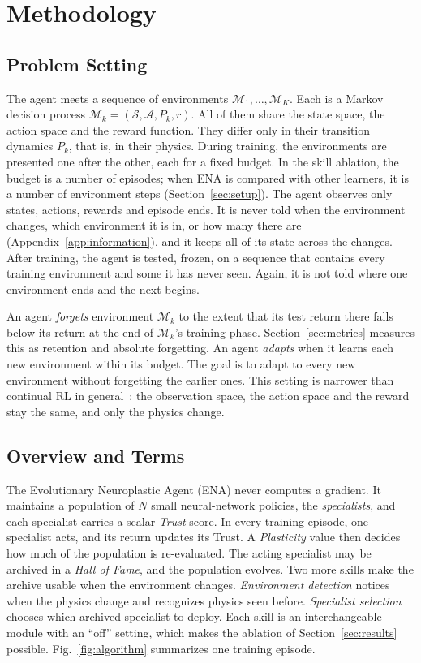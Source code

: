 \section{Methodology}
\label{sec:method}

\subsection{Problem Setting}
\label{sec:problem}
The agent meets a sequence of environments $\mathcal{M}_1, \dots, \mathcal{M}_K$. Each is a Markov decision process $\mathcal{M}_k = (\mathcal{S}, \mathcal{A}, P_k, r)$. All of them share the state space, the action space and the reward function. They differ only in their transition dynamics $P_k$, that is, in their physics. During training, the environments are presented one after the other, each for a fixed budget. In the skill ablation, the budget is a number of episodes; when ENA is compared with other learners, it is a number of environment steps (Section~\ref{sec:setup}). The agent observes only states, actions, rewards and episode ends. It is never told when the environment changes, which environment it is in, or how many there are (Appendix~\ref{app:information}), and it keeps all of its state across the changes. After training, the agent is tested, frozen, on a sequence that contains every training environment and some it has never seen. Again, it is not told where one environment ends and the next begins.

An agent \textit{forgets} environment $\mathcal{M}_k$ to the extent that its test return there falls below its return at the end of $\mathcal{M}_k$'s training phase. Section~\ref{sec:metrics} measures this as retention and absolute forgetting. An agent \textit{adapts} when it learns each new environment within its budget. The goal is to adapt to every new environment without forgetting the earlier ones. This setting is narrower than continual RL in general~\cite{khetarpal2022towards}: the observation space, the action space and the reward stay the same, and only the physics change.

\subsection{Overview and Terms}
The Evolutionary Neuroplastic Agent (ENA) never computes a gradient. It maintains a population of $N$ small neural-network policies, the \textit{specialists}, and each specialist carries a scalar \textit{Trust} score. In every training episode, one specialist acts, and its return updates its Trust. A \textit{Plasticity} value then decides how much of the population is re-evaluated. The acting specialist may be archived in a \textit{Hall of Fame}, and the population evolves. Two more skills make the archive usable when the environment changes. \textit{Environment detection} notices when the physics change and recognizes physics seen before. \textit{Specialist selection} chooses which archived specialist to deploy. Each skill is an interchangeable module with an ``off'' setting, which makes the ablation of Section~\ref{sec:results} possible. Fig.~\ref{fig:algorithm} summarizes one training episode.

